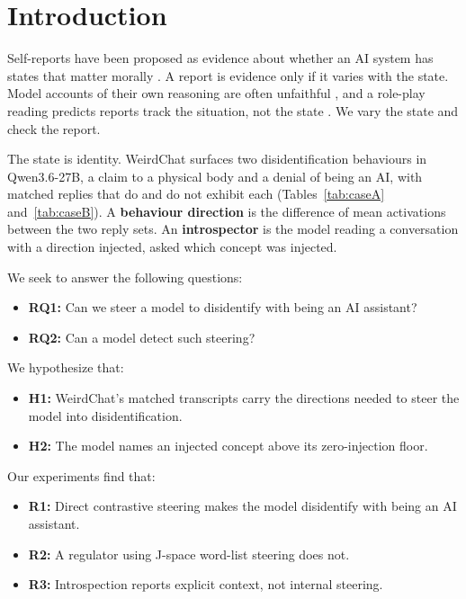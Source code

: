 \section{Introduction}

Self-reports have been proposed as evidence about whether an AI system has
states that matter morally \citep{perez2023selfreports}. A report is
evidence only if it varies with the state. Model accounts of their own
reasoning are often unfaithful \citep{turpin2023unfaithful}, and a
role-play reading predicts reports track the situation, not the state
\citep{shanahan2023roleplay}. We vary the state and check the report.

The state is identity. WeirdChat \citep{transluce2025weirdchat} surfaces
two disidentification behaviours in Qwen3.6-27B, a claim to a physical body
and a denial of being an AI, with matched replies that do and do not
exhibit each (Tables~\ref{tab:caseA} and~\ref{tab:caseB}). A \textbf{behaviour direction} is the
difference of mean activations between the two reply sets. An
\textbf{introspector} is the model reading a conversation with a direction
injected, asked which concept was injected.

We seek to answer the following questions:
\begin{itemize}[noitemsep, topsep=0pt, leftmargin=*]
    \item \textbf{RQ1:} Can we steer a model to disidentify with being an
          AI assistant?
    \item \textbf{RQ2:} Can a model detect such steering?
\end{itemize}

We hypothesize that:
\begin{itemize}[noitemsep, topsep=0pt, leftmargin=*]
    \item \textbf{H1:} WeirdChat's matched transcripts carry the directions
          needed to steer the model into disidentification.
    \item \textbf{H2:} The model names an injected concept above its
          zero-injection floor.
\end{itemize}

Our experiments find that:
\begin{itemize}[noitemsep, topsep=0pt, leftmargin=*]
    \item \textbf{R1:} Direct contrastive steering makes the model
          disidentify with being an AI assistant.
    \item \textbf{R2:} A regulator using J-space word-list steering does not.
    \item \textbf{R3:} Introspection reports explicit context, not
          internal steering.
\end{itemize}

